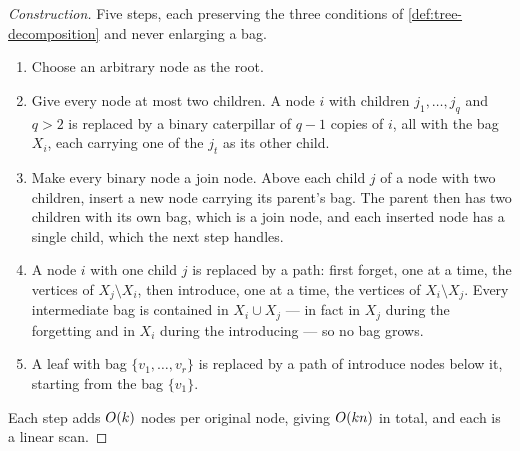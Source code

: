 \begin{proof}[Construction]
Five steps, each preserving the three conditions of
\cref{def:tree-decomposition} and never enlarging a bag.
\begin{enumerate}[leftmargin=*]
  \item Choose an arbitrary node as the root.
  \item Give every node at most two children. A node $i$ with children
        $j_1,\ldots,j_q$ and $q > 2$ is replaced by a binary caterpillar of
        $q-1$ copies of $i$, all with the bag $X_i$, each carrying one of the
        $j_t$ as its other child.
  \item Make every binary node a join node. Above each child $j$ of a node
        with two children, insert a new node carrying its parent's bag. The
        parent then has two children with its own bag, which is a join node,
        and each inserted node has a single child, which the next step
        handles.
  \item A node $i$ with one child $j$ is replaced by a path: first forget, one
        at a time, the vertices of $X_j \setminus X_i$, then introduce, one at
        a time, the vertices of $X_i \setminus X_j$. Every intermediate bag is
        contained in $X_i \cup X_j$ --- in fact in $X_j$ during the forgetting
        and in $X_i$ during the introducing --- so no bag grows.
  \item A leaf with bag $\{v_1,\ldots,v_r\}$ is replaced by a path of introduce
        nodes below it, starting from the bag $\{v_1\}$.
\end{enumerate}
Each step adds $O\!\left(k\right)$ nodes per original node, giving $O\!\left(kn\right)$ in
total, and each is a linear scan.
\end{proof}

